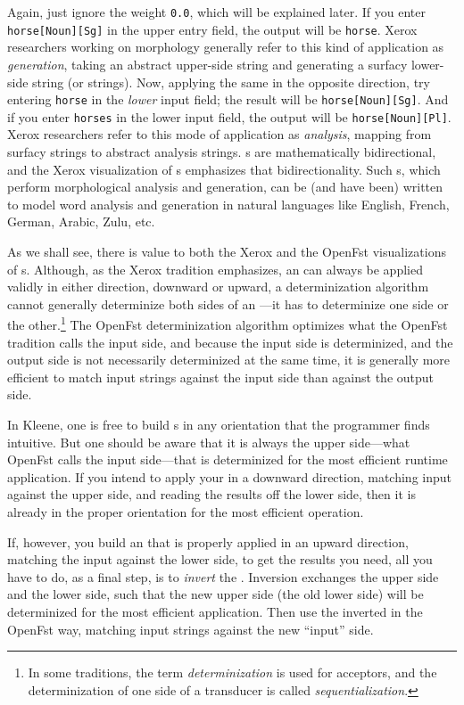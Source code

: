 \noindent
Again, just ignore the weight \texttt{0.0}, which will be explained later.  If you enter
\texttt{horse[Noun][Sg]} in the upper entry field, the output will be \texttt{horse}.  Xerox
researchers working on morphology 
generally refer to this kind of application as \emph{generation}, taking
an abstract upper-side string and generating a surfacy lower-side string (or strings).  Now,
applying the same \fst{} in the opposite direction, try entering 
\texttt{horse} in the \emph{lower} input field; the result will be \texttt{horse[Noun][Sg]}.
And if you enter \texttt{horses} in the lower input field, the output will be \texttt{horse[Noun][Pl]}.
Xerox researchers refer to this mode of application as \emph{analysis}, mapping from surfacy
strings to abstract analysis strings.  \fst{}s are mathematically bidirectional, and the Xerox visualization of
\fst{}s emphasizes that bidirectionality. 
Such \fst{}s, which perform morphological analysis and
generation, can be (and have been) written to model word analysis and generation in natural languages like English, French, German,
Arabic, Zulu, etc.

As we shall see, there is value to both the Xerox and the OpenFst
visualizations of \fst{}s.   Although, as the Xerox tradition emphasizes,
an \fst{} can always be applied validly in either
direction, downward or upward, a determinization algorithm cannot
generally determinize both sides of an \fst{}---it has to
determinize one side or the other.\footnote{In some traditions, the term
\emph{determinization} is used for acceptors, and the determinization of one
side of a transducer is called \emph{sequentialization}.}  The OpenFst determinization
algorithm optimizes what the OpenFst tradition calls the input side, and
because the input side is determinized, and the output side is not necessarily determinized at the same time, 
it is generally more efficient to match
input strings against the input side than against the output side. 

In Kleene, one is free to build \fst{}s in any orientation that the
programmer finds intuitive.  But one should be aware that it is always
the upper side---what OpenFst calls the input side---that is determinized
for the most efficient runtime application.  If you intend to apply
	your  \fst{} in a downward direction, matching input against the
	upper side, and reading the results off the lower side, then it is
	already in the proper orientation for the most efficient operation.  
	
If, however, you build an \fst{}
that is properly applied in an upward direction, matching the input
against the lower side, to get the results you need, all you have to do,
as a final step, is to \emph{invert} the \fst{}.  Inversion exchanges the upper
side and the lower side, such that the new upper side (the old lower
side) will be determinized for the most efficient application.  Then use
the inverted \fst{} in the OpenFst way, matching input strings against the
new ``input'' side.

